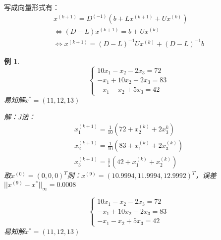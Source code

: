 \documentclass[a4paper]{article}
\newtheorem{example}{例}[section]
\begin{document}
写成向量形式有：
\begin{equation}
  \begin{array}{lr}
    x^{(k+1)} = D^{(-1)}(b+Lx^{(k+1)}+Ux^{(k)}) \\
    \Leftrightarrow (D-L)x^{(k+1)} = b + Ux^{(k)} \\
    \Leftrightarrow x^{(k+1)} = (D-L)^{-1}Ux^{(k)} + (D-L)^{-1}b 
  \end{array}
\end{equation}

\begin{example}
  $$\left\{
    \begin{array}{lr}
      10x_1-x_2-2x_3=72 \\
      -x_1+10x_2-2x_3=83 \\
      -x_1-x_2+5x_3=42
    \end{array}
    \right.$$
    易知解$x^*=(11,12,13)$

    解：J法：
    $$\begin{array}{lr}
      x_1^{(k+1)} = \frac{1}{10}(72 + x_2^{(k)}+2x_3^{k}) \\
      x_2^{(k+1)} = \frac{1}{10}(83 + x_1^{(k)}+2x_3^{(k)}) \\
      x_3^{(k+1)} = \frac{1}{5}(42+x_1^{(k)}+x_2^{(k)})
    \end{array}$$
    取$x^{(0)}=(0,0,0)^T $则：$x^{(9)}=(10.9994, 11.9994, 12.9992)^T $，误差$||x^{(9)}-x^*||_\infty = 0.0008 $

  $$\left\{
    \begin{array}{lr}
      10x_1-x_2-2x_3=72 \\
      -x_1+10x_2-2x_3=83 \\
      -x_1-x_2+5x_3=42
    \end{array}
    \right.$$
    易知解$x^*=(11,12,13)$

\end{example}
\end{document}
